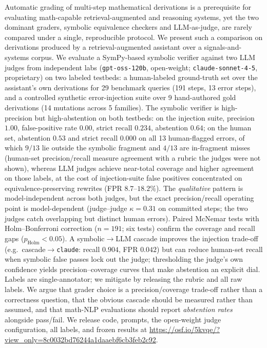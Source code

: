 Automatic grading of multi-step mathematical derivations is a prerequisite for
evaluating math-capable retrieval-augmented and reasoning systems, yet the two
dominant graders, symbolic equivalence checkers and LLM-as-judge, are rarely
compared under a single, reproducible protocol. We present such a comparison on
derivations produced by a retrieval-augmented assistant over a
signals-and-systems corpus. We evaluate a SymPy-based symbolic verifier against
two LLM judges from independent labs (\texttt{gpt-oss-120b}, open-weight;
\texttt{claude-sonnet-4-5}, proprietary) on two labeled testbeds: a
human-labeled ground-truth set over the assistant's own derivations for 29
benchmark queries (191 steps, 13 error steps), and a controlled synthetic
error-injection suite over 9 hand-authored gold derivations (14 mutations across
5 families). The
symbolic verifier is high-precision but high-abstention on both testbeds: on
the injection suite, precision $1.00$, false-positive rate $0.00$, strict
recall $0.234$, abstention $0.64$; on the human set, abstention $0.53$ and
strict recall $0.000$ on all 13 human-flagged errors, of which $9/13$ lie
outside the symbolic fragment and $4/13$ are in-fragment misses (human-set
precision/recall measure agreement with a rubric the judges were not shown),
whereas LLM judges achieve near-total coverage and higher agreement on those
labels, at the cost of injection-suite false positives concentrated on
equivalence-preserving rewrites (FPR $8.7$--$18.2\%$). The
\emph{qualitative} pattern is model-independent across both judges, but the exact
precision/recall operating point is model-dependent (judge--judge $\kappa{=}0.31$
on committed steps; the two judges catch overlapping but distinct human errors). Paired McNemar tests with Holm--Bonferroni
correction ($n{=}191$; six tests) confirm the coverage and recall gaps
($p_{\mathrm{Holm}}{<}0.05$). A symbolic$\rightarrow$LLM cascade improves the
injection trade-off (e.g.\ cascade$\rightarrow$\texttt{claude}: recall $0.904$,
FPR $0.042$) but can reduce human-set recall when symbolic false passes lock out
the judge; thresholding the judge's own confidence yields precision--coverage
curves that make abstention an explicit dial. Labels are single-annotator; we mitigate by releasing
the rubric and all raw labels. We argue that grader choice is a
precision/coverage trade-off rather than a correctness question, that the
obvious cascade should be measured rather than assumed, and that
math-NLP evaluations should report \emph{abstention rates} alongside pass/fail.
We release code, prompts, the open-weight judge configuration, all labels, and
frozen results at \url{https://osf.io/5kvqe/?view_only=8c0032bd76244a1daaebf6cb3feb2c92}.
